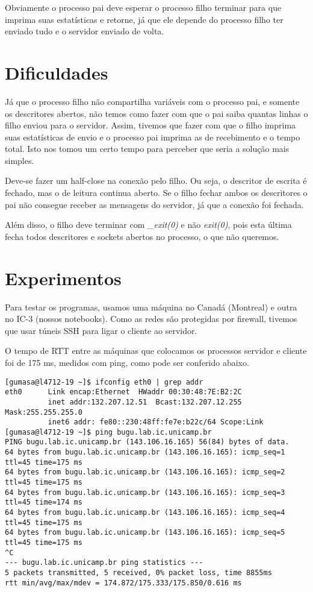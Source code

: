 \documentclass[12pt,a4paper]{article}
\begin{document}
Obviamente o processo pai deve esperar o processo filho terminar para
que imprima suas estatísticas e retorne, já que ele depende do
processo filho ter enviado tudo e o servidor enviado de volta. 

\section{Dificuldades}

Já que o processo filho não compartilha variáveis com o processo pai,
e somente os descritores abertos, não temos como fazer com que o pai
saiba quantas linhas o filho enviou para o servidor. Assim, tivemos
que fazer com que o filho imprima suas estatísticas de envio e o
processo pai imprima as de recebimento e o tempo total. Isto nos tomou
um certo tempo para perceber que seria a solução mais simples.

Deve-se fazer um half-close na conexão pelo filho. Ou seja, o
descritor de escrita é fechado, mas o de leitura continua aberto. Se o
filho fechar ambos os descritores o pai não consegue receber as
mensagens do servidor, já que a conexão foi fechada.

Além disso, o filho deve terminar com \textit{\_exit(0)} e não
\textit{exit(0)}, pois esta última fecha todos descritores e sockets
abertos no processo, o que não queremos.

\section{Experimentos}

Para testar os programas, usamos uma máquina no Canadá (Montreal) e outra no IC-3
(nossos notebooks). Como as redes são protegidas por firewall, tivemos
que usar túneis SSH para ligar o cliente ao servidor. 

O tempo de RTT entre as máquinas que colocamos os processos servidor e
cliente foi de 175 ms, medidos com ping, como pode ser conferido abaixo.

{\scriptsize 
\begin{verbatim}
[gumasa@l4712-19 ~]$ ifconfig eth0 | grep addr
eth0      Link encap:Ethernet  HWaddr 00:30:48:7E:B2:2C  
          inet addr:132.207.12.51  Bcast:132.207.12.255  Mask:255.255.255.0
          inet6 addr: fe80::230:48ff:fe7e:b22c/64 Scope:Link
[gumasa@l4712-19 ~]$ ping bugu.lab.ic.unicamp.br
PING bugu.lab.ic.unicamp.br (143.106.16.165) 56(84) bytes of data.
64 bytes from bugu.lab.ic.unicamp.br (143.106.16.165): icmp_seq=1 ttl=45 time=175 ms
64 bytes from bugu.lab.ic.unicamp.br (143.106.16.165): icmp_seq=2 ttl=45 time=175 ms
64 bytes from bugu.lab.ic.unicamp.br (143.106.16.165): icmp_seq=3 ttl=45 time=174 ms
64 bytes from bugu.lab.ic.unicamp.br (143.106.16.165): icmp_seq=4 ttl=45 time=175 ms
64 bytes from bugu.lab.ic.unicamp.br (143.106.16.165): icmp_seq=5 ttl=45 time=175 ms
^C
--- bugu.lab.ic.unicamp.br ping statistics ---
5 packets transmitted, 5 received, 0% packet loss, time 8855ms
rtt min/avg/max/mdev = 174.872/175.333/175.850/0.616 ms
\end{verbatim}}
\end{document}
